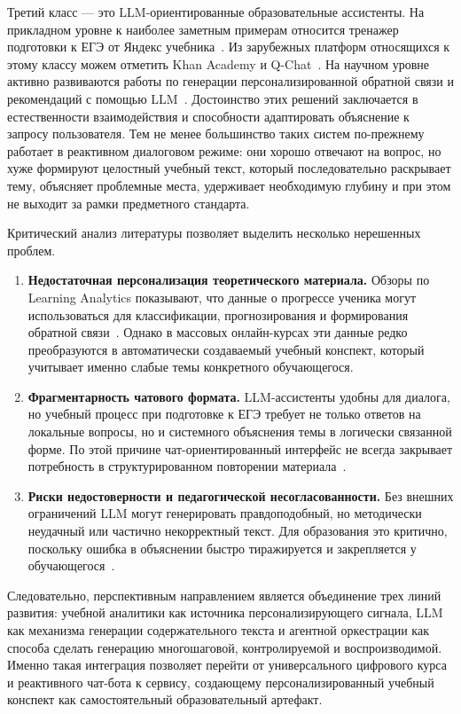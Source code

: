 \documentclass[a4paper,12pt]{extarticle}
\begin{document}
Третий класс --- это LLM-ориентированные образовательные ассистенты. На прикладном уровне к 
наиболее заметным примерам относится тренажер подготовки к ЕГЭ от Яндекс учебника~\cite{yandex2026ege_math}.
Из зарубежных платформ относящихся к этому классу можем отметить Khan Academy и Q-Chat~\cite{khanmigo2025,qchat2025}.
На научном уровне активно развиваются работы по генерации персонализированной обратной связи и рекомендаций с 
помощью LLM~\cite{pankiewicz2025feedback,wang2025tutorllm}. Достоинство этих решений заключается в 
естественности взаимодействия и способности адаптировать объяснение к запросу пользователя. Тем не менее 
большинство таких систем по-прежнему работает в реактивном диалоговом режиме: они хорошо отвечают на вопрос, 
но хуже формируют целостный учебный текст, который последовательно раскрывает тему, объясняет проблемные места, 
удерживает необходимую глубину и при этом не выходит за рамки предметного стандарта.

Критический анализ литературы позволяет выделить несколько нерешенных проблем.

\begin{enumerate}
    \item \textbf{Недостаточная персонализация теоретического материала.} Обзоры по Learning Analytics показывают, 
	что данные о прогрессе ученика могут использоваться для классификации, прогнозирования и формирования обратной 
	связи~\cite{khor2024la}. Однако в массовых онлайн-курсах эти данные редко преобразуются в автоматически 
	создаваемый учебный конспект, который учитывает именно слабые темы конкретного обучающегося.
    \item \textbf{Фрагментарность чатового формата.} LLM-ассистенты удобны для диалога, но учебный процесс при 
	подготовке к ЕГЭ требует не только ответов на локальные вопросы, но и системного объяснения темы в логически 
	связанной форме. По этой причине чат-ориентированный интерфейс не всегда закрывает потребность в 
	структурированном повторении материала~\cite{kasneci2023chatgpt,shi2025llmedu}.
    \item \textbf{Риски недостоверности и педагогической несогласованности.} Без внешних ограничений LLM могут 
	генерировать правдоподобный, но методически неудачный или частично некорректный текст. Для образования это 
	критично, поскольку ошибка в объяснении быстро тиражируется и закрепляется у 
	обучающегося~\cite{yan2024challenges,ding2025ragedu}.
\end{enumerate}

Следовательно, перспективным направлением является объединение трех линий развития: учебной аналитики как источника
 персонализирующего сигнала, LLM как механизма генерации содержательного текста и агентной оркестрации как способа 
 сделать генерацию многошаговой, контролируемой и воспроизводимой. Именно такая интеграция позволяет перейти от 
 универсального цифрового курса и реактивного чат-бота к сервису, создающему персонализированный учебный конспект 
 как самостоятельный образовательный артефакт.
\end{document}
